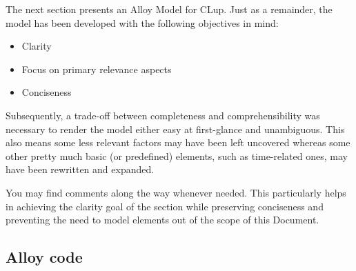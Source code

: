The next section presents an Alloy Model for CLup. Just as a remainder, the model has been developed with the following objectives in mind: \newline

\begin{itemize}
    \item Clarity
    \item Focus on primary relevance aspects
    \item Conciseness
\end{itemize}

Subsequently, a trade-off between completeness and comprehensibility was necessary to render the model either easy at first-glance and unambiguous. \newline 
This also means some less relevant factors may have been left uncovered whereas some other pretty much basic (or predefined) elements, such as time-related ones, may have been rewritten and expanded. 

You may find comments along the way whenever needed. This particularly helps in achieving the clarity goal of the section while preserving conciseness and preventing the need to model elements out of the scope of this Document.



\subsection{Alloy code}


